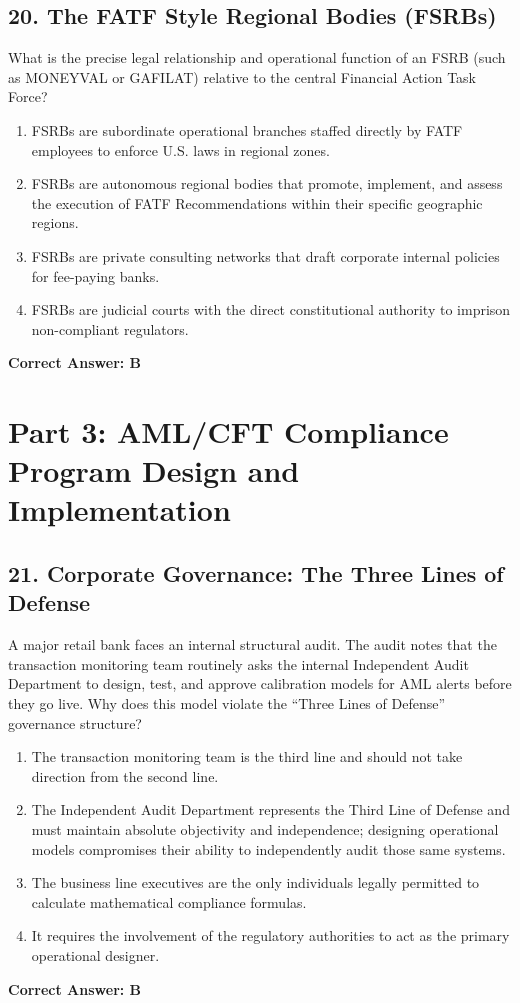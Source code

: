 \documentclass[11pt,a4paper]{article}
\begin{document}
	\subsection{20. The FATF Style Regional Bodies (FSRBs)}
	What is the precise legal relationship and operational function of an FSRB (such as MONEYVAL or GAFILAT) relative to the central Financial Action Task Force?
	\begin{enumerate}[label=\Alph*.]
		\item FSRBs are subordinate operational branches staffed directly by FATF employees to enforce U.S. laws in regional zones.
		\item FSRBs are autonomous regional bodies that promote, implement, and assess the execution of FATF Recommendations within their specific geographic regions.
		\item FSRBs are private consulting networks that draft corporate internal policies for fee-paying banks.
		\item FSRBs are judicial courts with the direct constitutional authority to imprison non-compliant regulators.
	\end{enumerate}
	\textbf{Correct Answer: B}
	
	\newpage
	\section{Part 3: AML/CFT Compliance Program Design and Implementation}
	
	\subsection{21. Corporate Governance: The Three Lines of Defense}
	A major retail bank faces an internal structural audit. The audit notes that the transaction monitoring team routinely asks the internal Independent Audit Department to design, test, and approve calibration models for AML alerts before they go live. Why does this model violate the ``Three Lines of Defense'' governance structure?
	\begin{enumerate}[label=\Alph*.]
		\item The transaction monitoring team is the third line and should not take direction from the second line.
		\item The Independent Audit Department represents the Third Line of Defense and must maintain absolute objectivity and independence; designing operational models compromises their ability to independently audit those same systems.
		\item The business line executives are the only individuals legally permitted to calculate mathematical compliance formulas.
		\item It requires the involvement of the regulatory authorities to act as the primary operational designer.
	\end{enumerate}
	\textbf{Correct Answer: B}
	
\end{document}
